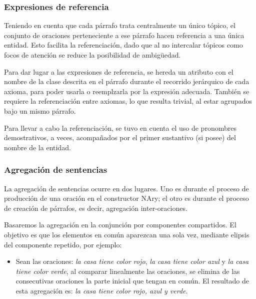 \subsubsection{Expresiones de referencia}
Teniendo en cuenta que cada párrafo trata centralmente un único tópico, el conjunto de oraciones perteneciente a ese párrafo hacen referencia a una única entidad. Esto facilita la referenciación, dado que al no intercalar tópicos como focos de atención se reduce la posibilidad de ambigüedad.

Para dar lugar a las expresiones de referencia, se hereda un atributo con el nombre de la clase descrita en el párrafo durante el recorrido jerárquico de cada axioma, para poder usarla o reemplzarla por la expresión adecuada. %
También se requiere la referenciación entre axiomas, lo que resulta trivial, al estar agrupados bajo un mismo párrafo. 

Para llevar a cabo la referenciación, se tuvo en cuenta el uso de pronombres demostrativos, a veces, acompañados por el primer sustantivo (si posee) del nombre de la entidad.


\subsubsection{Agregación de sentencias}
La agregación de sentencias ocurre en dos lugares. Uno es durante el proceso de producción de una oración en el constructor NAry; el otro es durante el proceso de creación de párrafos, es decir, agregación inter-oraciones.

Basaremos la agregación en la conjunción por componentes compartidos. El objetivo es que los elementos en común aparezcan una sola vez, mediante elipsis del componente repetido, por ejemplo:
\begin{itemize}
    \item Sean las oraciones: \emph{la casa tiene color rojo}, \emph{la casa tiene color azul} y \emph{la casa tiene color verde}, al comparar linealmente las oraciones, se elimina de las consecutivas oraciones la parte inicial que tengan en común. El resultado de esta agregación es: \emph{la casa tiene color rojo, azul y verde}.
\end{itemize}
    
